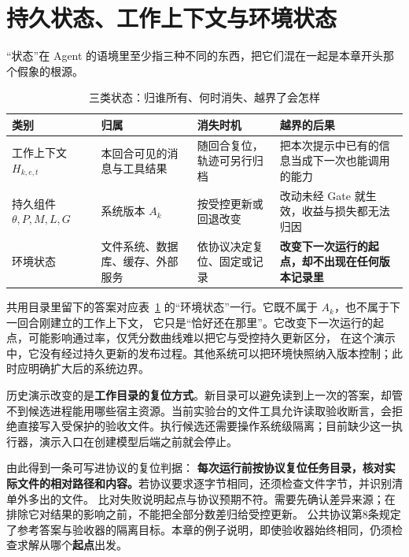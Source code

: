 \section{持久状态、工作上下文与环境状态}
\label{sec:ch02-states}

“状态”在 Agent 的语境里至少指三种不同的东西，把它们混在一起是本章开头那个假象的根源。

\begin{table}[htbp]
\centering
\caption{三类状态：归谁所有、何时消失、越界了会怎样}
\label{tab:states}
\begin{tabular}{>{\raggedright\arraybackslash}p{2.6cm}>{\raggedright\arraybackslash}p{3.2cm}>{\raggedright\arraybackslash}p{3.4cm}>{\raggedright\arraybackslash}p{4.4cm}}
\toprule
类别 & 归属 & 消失时机 & 越界的后果 \\
\midrule
工作上下文 $H_{k,e,t}$ & 本回合可见的消息与工具结果 & 随回合复位，轨迹可另行归档 & 把本次提示中已有的信息当成下一次也能调用的能力 \\
持久组件 $\theta,P,M,L,G$ & 系统版本 $A_k$ & 按受控更新或回退改变 & 改动未经 Gate 就生效，收益与损失都无法归因 \\
环境状态 & 文件系统、数据库、缓存、外部服务 & 依协议决定复位、固定或记录 & \textbf{改变下一次运行的起点，却不出现在任何版本记录里} \\
\bottomrule
\end{tabular}
\end{table}

共用目录里留下的答案对应表~\ref{tab:states} 的“环境状态”一行。它既不属于 $A_k$，也不属于下一回合刚建立的工作上下文，
它只是“恰好还在那里”。它改变下一次运行的起点，可能影响通过率，仅凭分数曲线难以把它与受控持久更新区分，
在这个演示中，它没有经过持久更新的发布过程。其他系统可以把环境快照纳入版本控制；此时应明确扩大后的系统边界。

\begin{sloppypar}
历史演示改变的是\textbf{工作目录的复位方式}。新目录可以避免读到上一次的答案，却管不到候选进程能用哪些宿主资源。当前实验台的文件工具允许读取验收断言，会拒绝直接写入受保护的验收文件。执行候选还需要操作系统级隔离；目前缺少这一执行器，演示入口在创建模型后端之前就会停止。
\end{sloppypar}

由此得到一条可写进协议的复位判据：
\textbf{每次运行前按协议复位任务目录，核对实际文件的相对路径和内容。}若协议要求逐字节相同，还须检查文件字节，并识别清单外多出的文件。
比对失败说明起点与协议预期不符。需要先确认差异来源；在排除它对结果的影响之前，不能把全部分数差归给受控更新。
公共协议第8条规定了参考答案与验收器的隔离目标。本章的例子说明，即使验收器始终相同，仍须检查求解从哪个\textbf{起点}出发。

